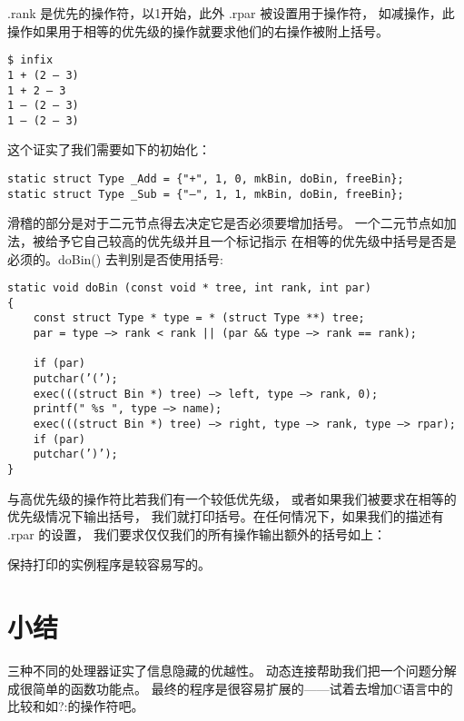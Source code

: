 .rank 是优先的操作符，以1开始，此外 .rpar 被设置用于操作符，
如减操作，此操作如果用于相等的优先级的操作就要求他们的右操作被附上括号。
\begin{lstlisting}
$ infix
1 + (2 — 3)
1 + 2 — 3
1 — (2 — 3)
1 — (2 — 3)
\end{lstlisting}

这个证实了我们需要如下的初始化：
\begin{lstlisting}
static struct Type _Add = {"+", 1, 0, mkBin, doBin, freeBin};
static struct Type _Sub = {"—", 1, 1, mkBin, doBin, freeBin};
\end{lstlisting}

滑稽的部分是对于二元节点得去决定它是否必须要增加括号。
一个二元节点如加法，被给予它自己较高的优先级并且一个标记指示
在相等的优先级中括号是否是必须的。doBin() 去判别是否使用括号:
\begin{lstlisting}
static void doBin (const void * tree, int rank, int par)
{
    const struct Type * type = * (struct Type **) tree;
    par = type —> rank < rank || (par && type —> rank == rank);
    
    if (par)
    putchar(’(’);
    exec(((struct Bin *) tree) —> left, type —> rank, 0);
    printf(" %s ", type —> name);
    exec(((struct Bin *) tree) —> right, type —> rank, type —> rpar);
    if (par)
    putchar(’)’);
}
\end{lstlisting}

与高优先级的操作符比若我们有一个较低优先级，
或者如果我们被要求在相等的优先级情况下输出括号，
我们就打印括号。在任何情况下，如果我们的描述有 .rpar 的设置，
我们要求仅仅我们的所有操作输出额外的括号如上：

保持打印的实例程序是较容易写的。

\section{小结}
三种不同的处理器证实了信息隐藏的优越性。
动态连接帮助我们把一个问题分解成很简单的函数功能点。
最终的程序是很容易扩展的——试着去增加C语言中的比较和如?:的操作符吧。  


\newpage{\thispagestyle{empty}\cleardoublepage}

